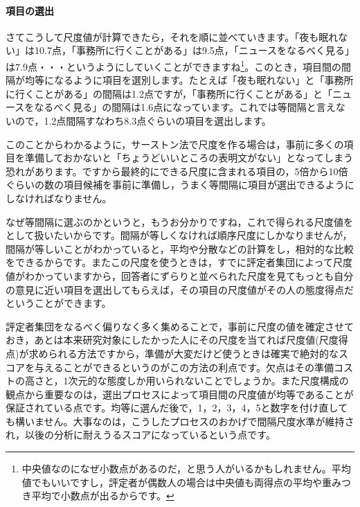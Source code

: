 \documentclass{ltjsbook}
\begin{document}
\paragraph{項目の選出}さてこうして尺度値が計算できたら，それを順に並べていきます。「夜も眠れない」は10.7点，「事務所に行くことがある」は9.5点，「ニュースをなるべく見る」は7.9点・・・というようにしていくことができますね\footnote{中央値なのになぜ小数点があるのだ，と思う人がいるかもしれません。平均値でもいいですし，評定者が偶数人の場合は中央値も両得点の平均や重みつき平均で小数点が出るからです。}。このとき，項目間の間隔が均等になるように項目を選別します。たとえば「夜も眠れない」と「事務所に行くことがある」の間隔は1.2点ですが，「事務所に行くことがある」と「ニュースをなるべく見る」の間隔は1.6点になっています。これでは等間隔と言えないので，1.2点間隔すなわち8.3点ぐらいの項目を選出します。

このことからわかるように，サーストン法で尺度を作る場合は，事前に多くの項目を準備しておかないと「ちょうどいいところの表明文がない」となってしまう恐れがあります。ですから最終的にできる尺度に含まれる項目の，5倍から10倍ぐらいの数の項目候補を事前に準備し，うまく等間隔に項目が選出できるようにしなければなりません。

なぜ等間隔に選ぶのかというと，もうお分かりですね，これで得られる尺度値をとして扱いたいからです。間隔が等しくなければ順序尺度にしかなりませんが，間隔が等しいことがわかっていると，平均や分散などの計算をし，相対的な比較をできるからです。またこの尺度を使うときは，すでに評定者集団によって尺度値がわかっていますから，回答者にずらりと並べられた尺度を見てもっとも自分の意見に近い項目を選出してもらえば，その項目の尺度値がその人の態度得点だということができます。

評定者集団をなるべく偏りなく多く集めることで，事前に尺度の値を確定させておき，あとは本来研究対象にしたかった人にその尺度を当てれば尺度値(尺度得点)が求められる方法ですから，準備が大変だけど使うときは確実で絶対的なスコアを与えることができるというのがこの方法の利点です。欠点はその準備コストの高さと，1次元的な態度しか用いられないことでしょうか。また尺度構成の観点から重要なのは，選出プロセスによって項目間の尺度値が均等であることが保証されている点です。均等に選んだ後で，1，2，3，4，5と数字を付け直しても構いません。大事なのは，こうしたプロセスのおかげで間隔尺度水準が維持され，以後の分析に耐えうるスコアになっているという点です。
\end{document}
